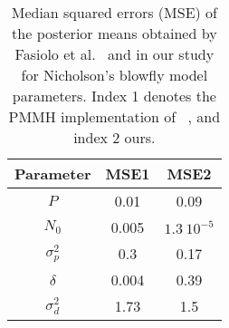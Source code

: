 \documentclass[12pt]{article}
\newcommand{\ra}[1]{\renewcommand{\arraystretch}{#1}}
\begin{document}
	\begin{table}[htb]
		\centering
		\vspace{10mm}
		\ra{1.3}
		\begin{tabular}{@{}ccc@{}} \toprule
			Parameter & MSE1 & MSE2 \\ \midrule 
			$P$ & 0.01 & 0.09 \\ 
			$N_0$ & 0.005 & $1.3 \ 10^{-5}$  \\ 
			$\sigma_p^2$ & 0.3 & 0.17  \\
			$\delta$ & 0.004 & 0.39  \\
			$\sigma_d^2$ & 1.73 & 1.5  \\ \bottomrule
		\end{tabular}
		\caption[Comparison between the mean square errors of posterior estimates of the parameters obtain in this study and in Fasiolo et al.~\cite{fasiolo2014statistical}, Nicholson's blowfly model ]{Median squared errors (MSE) of the posterior means obtained by Fasiolo et al.~\cite{fasiolo2014statistical} and in our study for Nicholson's blowfly model parameters. Index 1 denotes the PMMH implementation of ~\cite{fasiolo2014statistical}, and index 2 ours.}
		\label{table:mseBlowfly}
	\end{table}
\end{document}

